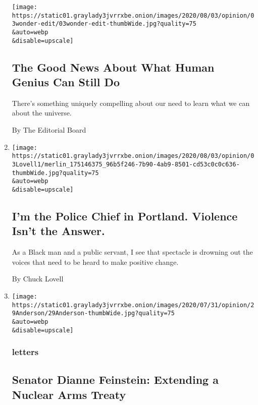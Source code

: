 \begin{enumerate}
  \texttt{[image: https://static01.graylady3jvrrxbe.onion/images/2020/08/03/opinion/03wonder-edit/03wonder-edit-thumbWide.jpg?quality=75\\\&auto=webp\\\&disable=upscale]}

  \hypertarget{the-good-news-about-what-human-genius-can-still-do}{%
  \subsection{The Good News About What Human Genius Can Still
  Do}\label{the-good-news-about-what-human-genius-can-still-do}}

  There's something uniquely compelling about our need to learn what we
  can about the universe.

  By The Editorial Board
\item
  \href{/2020/08/03/opinion/portland-protests-police-chief.html}{}

  \texttt{[image: https://static01.graylady3jvrrxbe.onion/images/2020/08/03/opinion/03Lovell1/merlin\_175146375\_96b5f246-7b90-4ab9-8501-cd53c0c0c636-thumbWide.jpg?quality=75\\\&auto=webp\\\&disable=upscale]}

  \hypertarget{im-the-police-chief-in-portland-violence-isnt-the-answer}{%
  \subsection{I'm the Police Chief in Portland. Violence Isn't the
  Answer.}\label{im-the-police-chief-in-portland-violence-isnt-the-answer}}

  As a Black man and a public servant, I see that spectacle is drowning
  out the voices that need to be heard to make positive change.

  By Chuck Lovell
\item
  \href{/2020/08/03/opinion/letters/nuclear-arms-treaty.html}{}

  \texttt{[image: https://static01.graylady3jvrrxbe.onion/images/2020/07/31/opinion/29Anderson/29Anderson-thumbWide.jpg?quality=75\\\&auto=webp\\\&disable=upscale]}

  \hypertarget{letters}{%
  \subsubsection{letters}\label{letters}}

  \hypertarget{senator-dianne-feinstein-extending-a-nuclear-arms-treaty}{%
  \subsection{Senator Dianne Feinstein: Extending a Nuclear Arms
  Treaty}\label{senator-dianne-feinstein-extending-a-nuclear-arms-treaty}}


\end{enumerate}
